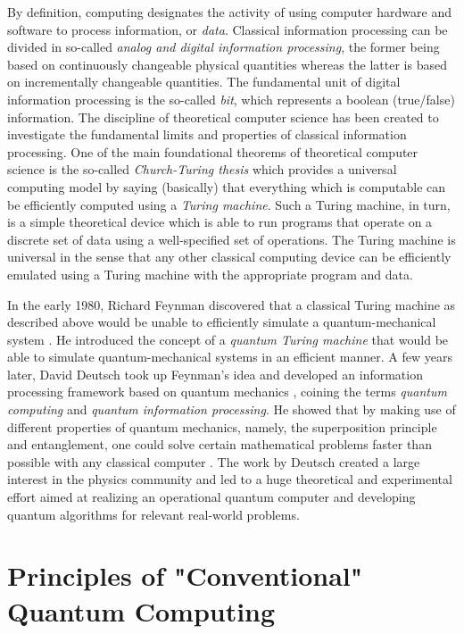 By definition, computing designates the activity of using computer hardware and software to process information, or {\it data}. Classical information processing can be divided in so-called {\it analog and digital information processing}, the former being based on continuously changeable physical quantities whereas the latter is based on incrementally changeable quantities. The fundamental unit of digital information processing is the so-called {\it bit}, which represents a boolean (true/false) information. The discipline of theoretical computer science has been created to investigate the fundamental limits and properties of classical information processing. One of the main foundational theorems of theoretical computer science is the so-called {\it Church-Turing thesis} which provides a universal computing model by saying (basically) that everything which is computable can be efficiently computed using a {\it Turing machine}. Such a Turing machine, in turn, is a simple theoretical device which is able to run programs that operate on a discrete set of data using a well-specified set of operations. The Turing machine is universal in the sense that any other classical computing device can be efficiently emulated using a Turing machine with the appropriate program and data.

\smallskip

In the early 1980, Richard Feynman discovered that a classical Turing machine as described above would be unable to efficiently simulate a quantum-mechanical system \citep{feynman_simulating_1982}. He introduced the concept of a {\it quantum Turing machine} that would be able to simulate quantum-mechanical systems in an efficient manner. A few years later, David Deutsch took up Feynman's idea and developed an information processing framework based on quantum mechanics \citep{deutsch_quantum_1985}, coining the terms {\it quantum computing} and {\it quantum information processing}. He showed that by making use of different properties of quantum mechanics, namely, the superposition principle and entanglement, one could solve certain mathematical problems faster than possible with any classical computer \citep{deutsch_quantum_1985}. The work by Deutsch created a large interest in the physics community and led to a huge theoretical and experimental effort aimed at realizing an operational quantum computer and developing quantum algorithms for relevant real-world problems.

\section{Principles of "Conventional" Quantum Computing}

